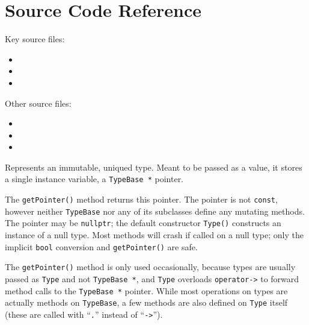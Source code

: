 \documentclass[../generics]{subfiles}
\begin{document}
\section{Source Code Reference}\label{src:types}

Key source files:
\begin{itemize}
\item {}
\item {}
\item {}
\end{itemize}
Other source files:
\begin{itemize}
\item {}
\item {}
\item {}
\end{itemize}

Represents an immutable, uniqued type. Meant to be passed as a value, it stores a single instance variable, a \texttt{TypeBase *} pointer.

The \texttt{getPointer()} method returns this pointer. The pointer is not \texttt{const}, however neither \texttt{TypeBase} nor any of its subclasses define any mutating methods. The pointer may be \texttt{nullptr}; the default constructor \texttt{Type()} constructs an instance of a null type. Most methods will crash if called on a null type; only the implicit \texttt{bool} conversion and \texttt{getPointer()} are safe.

The \texttt{getPointer()} method is only used occasionally, because types are usually passed as \texttt{Type} and not \texttt{TypeBase *}, and \texttt{Type} overloads \texttt{operator->} to forward method calls to the \texttt{TypeBase *} pointer. While most operations on types are actually methods on \texttt{TypeBase}, a few methods are also defined on \texttt{Type} itself (these are called with ``\texttt{.}'' instead of ``\texttt{->}'').
\end{document}
